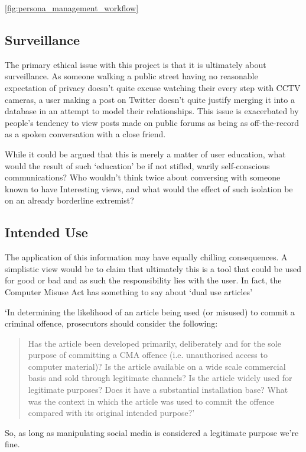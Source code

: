 \ref{fig:persona_management_workflow}

\subsection{Surveillance}
The primary ethical issue with this project is that it is ultimately about surveillance. As someone walking a public street having no reasonable expectation of privacy doesn't quite excuse watching their every step with CCTV cameras, a user making a post on Twitter doesn't quite justify merging it into a database in an attempt to model their relationships. This issue is exacerbated by people's tendency to view posts made on public forums as being as off-the-record as a spoken conversation with a close friend.

While it could be argued that this is merely a matter of user education, what would the result of such `education' be if not stifled, warily self-conscious communications? Who wouldn't think twice about conversing with someone known to have Interesting views, and what would the effect of such isolation be on an already borderline extremist?

\subsection{Intended Use}
The application of this information may have equally chilling consequences. A simplistic view would be to claim that ultimately this is a tool that could be used for good or bad and as such the responsibility lies with the user.  In fact, the Computer Misuse Act has something to say about `dual use articles' \cite{misuseAct} \cite{lightBlue}

`In determining the likelihood of an article being used (or misused) to commit a criminal offence, prosecutors should consider the following:
\begin{quotation}
    Has the article been developed primarily, deliberately and for the sole purpose of committing a CMA offence (i.e. unauthorised access to computer material)?
    Is the article available on a wide scale commercial basis and sold through legitimate channels?
    Is the article widely used for legitimate purposes?
    Does it have a substantial installation base?
    What was the context in which the article was used to commit the offence compared with its original intended purpose?'
\end{quotation}

So, as long as manipulating social media\cite{spyOp} is considered a legitimate purpose we're fine.

